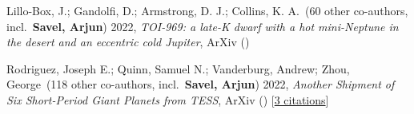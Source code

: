 \item[{\color{numcolor}\scriptsize2}] Lillo-Box, J.; Gandolfi, D.; Armstrong, D. J.; Collins, K. A.\etal\ ({60} other co-authors, incl.\ \textbf{Savel, Arjun}) 2022, \emph{TOI-969: a late-K dwarf with a hot mini-Neptune in the desert and an eccentric cold Jupiter}, ArXiv ()

\item[{\color{numcolor}\scriptsize1}] Rodriguez, Joseph E.; Quinn, Samuel N.; Vanderburg, Andrew; Zhou, George\etal\ ({118} other co-authors, incl.\ \textbf{Savel, Arjun}) 2022, \emph{Another Shipment of Six Short-Period Giant Planets from TESS}, ArXiv () [\href{https://ui.adsabs.harvard.edu/abs/2022arXiv220505709R}{3 citations}]